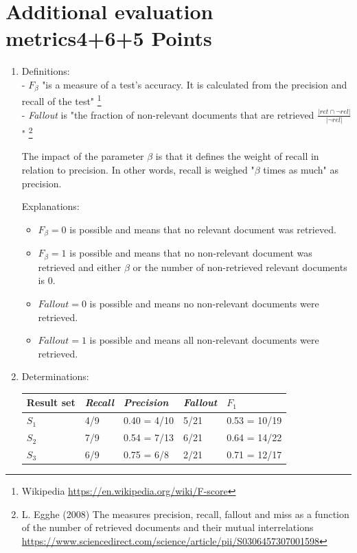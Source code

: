 \documentclass[10pt,a4paper]{article}
\begin{document}
\section{\hfill Additional evaluation metrics\hfill 4+6+5 Points}
\begin{enumerate}
    \item Definitions:\\
        - $F_\beta$ "is a measure of a test's accuracy. It is calculated from the precision and recall of the test" \footnote{Wikipedia \url{https://en.wikipedia.org/wiki/F-score}}\\
        - \textit{Fallout} is "the fraction of non-relevant documents that are retrieved $ \frac{|ret\cap \neg rel|}{|\neg rel|} $" \footnote{L. Egghe (2008) The measures precision, recall, fallout and miss as a function of the number of retrieved documents and their mutual interrelations \url{https://www.sciencedirect.com/science/article/pii/S0306457307001598}}
        
        The impact of the parameter $\beta$ is that it defines the weight of recall in relation to precision. In other words, recall is weighed "$\beta$ times as much" as precision.
        
        Explanations:
        \begin{itemize}
            \item $F_\beta=0$ is possible and means that no relevant document was retrieved.
            \item $F_\beta=1$ is possible and means that no non-relevant document was retrieved and either $\beta$ or the number of non-retrieved relevant documents is $0$.
            \item $Fallout=0$ is possible and means no non-relevant documents were retrieved.
            \item $Fallout=1$ is possible and means all non-relevant documents were retrieved.
        \end{itemize}
    \item Determinations:
    
        \begin{tabular}{l|l|l|l|l}
            Result set&\textit{Recall}&\textit{Precision}&\textit{Fallout}&$F_1$\\
            \hline
            $S_1$ &4/9   &0.40 = 4/10   &5/21   &0.53 = 10/19\\
            $S_2$ &7/9   &0.54 = 7/13   &6/21   &0.64 = 14/22\\
            $S_3$ &6/9   &0.75 = 6/8   &2/21   &0.71 = 12/17\\
        \end{tabular}
        

\end{enumerate}
\end{document}
